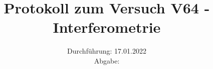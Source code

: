 \titlehead{\texttt{[image: resources/logo.jpg]}}
\title{Protokoll zum Versuch V64 - Interferometrie \\ }
\date{Durchführung: 17.01.2022 \\ Abgabe:  }

